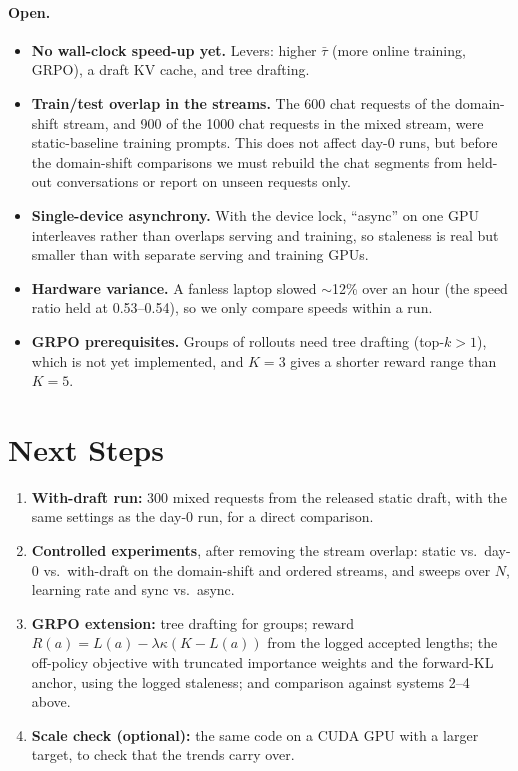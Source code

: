\documentclass[11pt]{article}
\newcommand{\taubar}{\bar{\tau}}
\begin{document}
\paragraph{Open.}
\begin{itemize}
  \item \textbf{No wall-clock speed-up yet.} Levers: higher $\taubar$ (more online training, GRPO), a draft KV
  cache, and tree drafting.
  \item \textbf{Train/test overlap in the streams.} The 600 chat requests of the domain-shift stream, and 900 of
  the 1000 chat requests in the mixed stream, were static-baseline training prompts. This does not affect day-0
  runs, but before the domain-shift comparisons we must rebuild the chat segments from held-out conversations or
  report on unseen requests only.
  \item \textbf{Single-device asynchrony.} With the device lock, ``async'' on one GPU interleaves rather than
  overlaps serving and training, so staleness is real but smaller than with separate serving and training GPUs.
  \item \textbf{Hardware variance.} A fanless laptop slowed $\sim$12\% over an hour (the speed ratio held at
  0.53--0.54), so we only compare speeds within a run.
  \item \textbf{GRPO prerequisites.} Groups of rollouts need tree drafting (top-$k>1$), which is not yet
  implemented, and $K=3$ gives a shorter reward range than $K=5$.
\end{itemize}

\section{Next Steps}

\begin{enumerate}
  \item \textbf{With-draft run:} 300 mixed requests from the released static draft, with the same settings as
  the day-0 run, for a direct comparison.
  \item \textbf{Controlled experiments}, after removing the stream overlap: static vs.\ day-0 vs.\ with-draft on
  the domain-shift and ordered streams, and sweeps over $N$, learning rate and sync vs.\ async.
  \item \textbf{GRPO extension:} tree drafting for groups; reward $R(a)=L(a)-\lambda\kappa(K-L(a))$ from the
  logged accepted lengths; the off-policy objective with truncated importance weights and the forward-KL
  anchor, using the logged staleness; and comparison against systems 2--4 above.
  \item \textbf{Scale check (optional):} the same code on a CUDA GPU with a larger target, to check that the
  trends carry over.
\end{enumerate}
\end{document}
